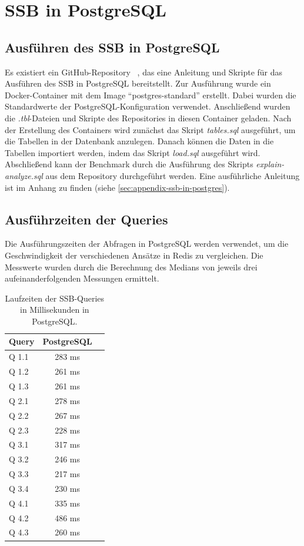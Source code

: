 \chapter{SSB in PostgreSQL}\label{sec:ssb-in-postgres}
\section{Ausführen des SSB in PostgreSQL}

Es existiert ein GitHub-Repository ~\cite{nukoyokohama_ssb-postgres_2023}, das eine Anleitung und Skripte für das Ausführen des \ac{SSB} in PostgreSQL bereitstellt.
Zur Ausführung wurde ein Docker-Container mit dem Image \enquote{postgres-standard} erstellt.
Dabei wurden die Standardwerte der PostgreSQL-Konfiguration verwendet.
Anschließend wurden die \emph{.tbl}-Dateien und Skripte des Repositories in diesen Container geladen. 
Nach der Erstellung des Containers wird zunächst das Skript \emph{tables.sql} ausgeführt, um die Tabellen in der Datenbank anzulegen.
Danach können die Daten in die Tabellen importiert werden, indem das Skript \emph{load.sql} ausgeführt wird.
Abschließend kann der Benchmark durch die Ausführung des Skripts \emph{explain-analyze.sql} aus dem Repository durchgeführt werden.
Eine ausführliche Anleitung ist im Anhang zu finden (siehe \cref{sec:appendix-ssb-in-postgres}).
\newpage
\section{Ausführzeiten der Queries} %
Die Ausführungszeiten der Abfragen in PostgreSQL werden verwendet, um die Geschwindigkeit der verschiedenen Ansätze in Redis zu vergleichen. Die Messwerte wurden durch die Berechnung des Medians von jeweils drei aufeinanderfolgenden Messungen ermittelt.
\begin{table}[h]
\centering
\begin{tabular}{lcc}
\hline
Query & PostgreSQL \\ \hline
Q 1.1 & 283 ms       \\
Q 1.2 & 261 ms       \\
Q 1.3 & 261 ms       \\
Q 2.1 & 278 ms       \\
Q 2.2 & 267 ms       \\
Q 2.3 & 228 ms       \\
Q 3.1 & 317 ms       \\
Q 3.2 & 246 ms       \\
Q 3.3 & 217 ms       \\
Q 3.4 & 230 ms       \\
Q 4.1 & 335 ms       \\
Q 4.2 & 486 ms       \\
Q 4.3 & 260 ms       \\ \hline
\end{tabular}
\caption{Laufzeiten der SSB-Queries in Millisekunden in PostgreSQL.}
\label{tab:results-postgres}
\end{table}

